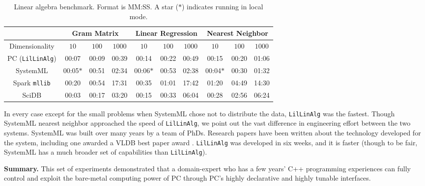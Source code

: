 \begin{table}[h!]
\begin{center}
\begin{tabular}{|c||c|c|c||c|c|c||c|c|c||}
\hline
& \multicolumn{3}{c||}{Gram Matrix} & \multicolumn{3}{c||}{Linear Regression} & \multicolumn{3}{c||}{Nearest Neighbor} \\
\hline
Dimensionality & $10$ & $100$ & $1000$& $10$ & $100$ & $1000$& $10$ & $100$ & $1000$ \\
\hline
\hline
PC (\texttt{LilLinAlg}) &00:07 & 00:09 &00:39 &00:14 &00:22 &00:49& 00:15 & 00:20 & 01:06 \\
SystemML &00:05$*$ &00:51 &02:34 &00:06$*$ &00:53 &02:38 &00:04$*$ &00:30 &01:32 \\
Spark \texttt{mllib} &00:20  &00:54 &17:31 &00:35 &01:01 &17:42 &01:20 & 04:49 &14:30 \\
SciDB   &00:03 &00:17 &03:20 &00:15 &00:33 &06:04 &00:28 &02:56 & 06:24 \\
\hline
\end{tabular}
\caption{Linear algebra benchmark. Format is MM:SS.
A star ($*$) indicates running in local mode.}
\label{fig:LR}
\end{center}
\end{table}

In every case except for the small problems when SystemML chose not to distribute the data,
\texttt{LilLinAlg} was the fastest.  
Though SystemML nearest neighbor approached the speed of 
\texttt{LilLinAlg}, we point out the vast difference in engineering effort between the two systems.  
SystemML was built over many years by a team of PhDs. Research papers have been written about the
technology developed for the system, including one awarded a VLDB best paper award \cite{boehm2016systemml}.
\texttt{LilLinAlg} was developed in six weeks, and it is faster (though to be fair, SystemML has a much broader
set of capabilities than \texttt{LilLinAlg}).

\vspace{5pt}
\noindent
\textbf{Summary.} This set of experiments demonstrated that a
domain-expert who has a few years' C++ programming experiences can fully control and
exploit the bare-metal computing power of PC through PC's highly
declarative and highly tunable interfaces.

